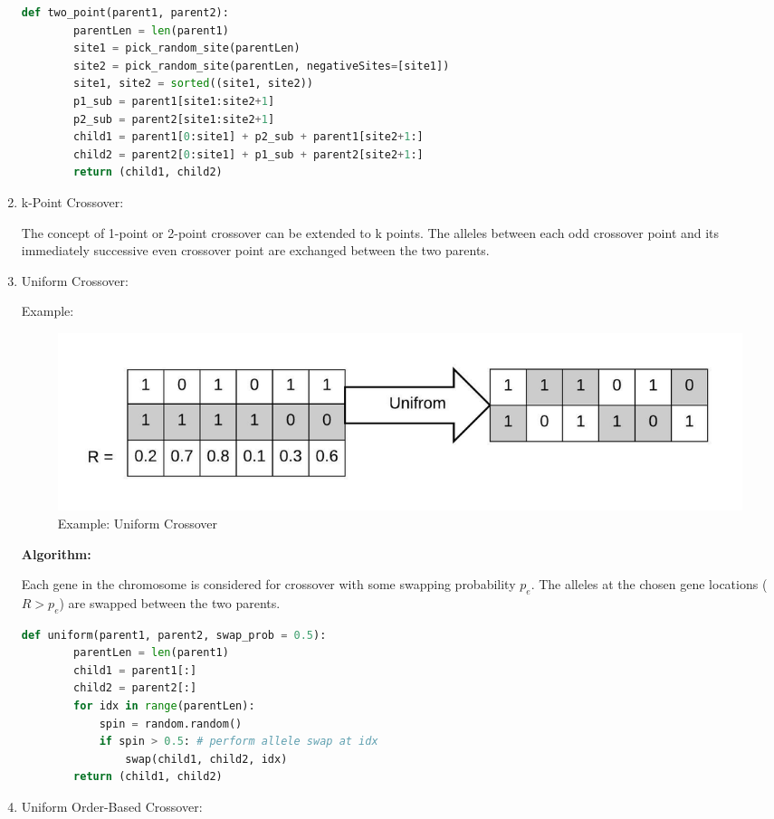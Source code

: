 \documentclass[12pt,a4paper]{article}
\begin{document}
\begin{enumerate}
	\begin{lstlisting}[language=Python]
    def two_point(parent1, parent2):
        parentLen = len(parent1)
        site1 = pick_random_site(parentLen)
        site2 = pick_random_site(parentLen, negativeSites=[site1])    
        site1, site2 = sorted((site1, site2))
        p1_sub = parent1[site1:site2+1]
        p2_sub = parent2[site1:site2+1]
        child1 = parent1[0:site1] + p2_sub + parent1[site2+1:]
        child2 = parent2[0:site1] + p1_sub + parent2[site2+1:]
        return (child1, child2)
	\end{lstlisting}

	\item k-Point Crossover: \par
	The concept of 1-point or 2-point crossover can be extended to k points. The alleles between each odd crossover point and its immediately successive even crossover point are exchanged between the two parents.
	
	\item Uniform Crossover: \par
	Example:
	\begin{figure}[h]
		\includegraphics[width=\textwidth]{xover-uniform}
		\caption{Example: Uniform Crossover}
		\centering
	\end{figure}
	
	\textbf{Algorithm:} \par
	Each gene in the chromosome is considered for crossover with some swapping probability $p_{e}$. The alleles at the chosen gene locations ($R > p_{e}$) are swapped between the two parents.
	
	\begin{lstlisting}[language=Python]
    def uniform(parent1, parent2, swap_prob = 0.5):
        parentLen = len(parent1)
        child1 = parent1[:]
        child2 = parent2[:]
        for idx in range(parentLen):
            spin = random.random()
            if spin > 0.5: # perform allele swap at idx
                swap(child1, child2, idx)
        return (child1, child2)
	\end{lstlisting}

	\item Uniform Order-Based Crossover:
	\begin{lstlisting}[language=Python]
	\end{lstlisting}


\end{enumerate}
\end{document}
